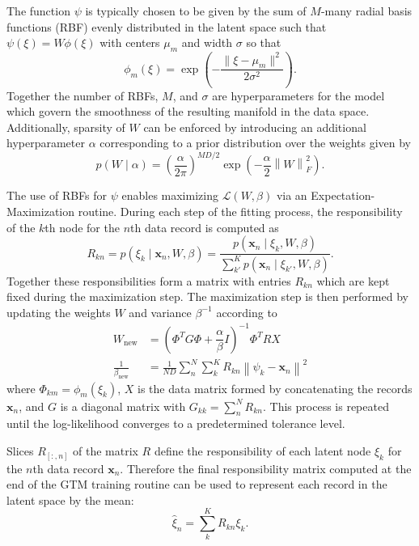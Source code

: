 \documentclass[remotesensing,article,submit,pdftex,moreauthors]{Definitions/mdpi}
\begin{document}
The function $\psi$ is typically chosen to be given by the sum of $M$-many radial basis functions (RBF) evenly distributed in the latent space such that $\psi(\xi) = W\phi(\xi)$ with centers $\mu_m$ and width $\sigma$ so that
\begin{equation}
    \phi_m(\xi) = \exp\left(-\dfrac{\lVert \xi - \mu_m \rVert^2}{2\sigma^2}\right).
\end{equation}
Together the number of RBFs, $M$, and $\sigma$ are hyperparameters for the model which govern the smoothness of the resulting manifold in the data space. Additionally, sparsity of $W$ can be enforced by introducing an additional hyperparameter $\alpha$ corresponding to a prior distribution over the weights given by
\begin{equation}\label{eq:weight-prior}
    p(W \mid \alpha) =  \left( \frac{\alpha}{2\pi} \right)^{MD/2}\exp\left(-\frac{\alpha}{2}\left\lVert W \right\rVert_{F}^2\right).
\end{equation}

The use of RBFs for $\psi$ enables maximizing $\mathcal{L}(W,\beta)$ via an Expectation-Maximization routine. During each step of the fitting process, the responsibility of the $k$th node for the $n$th data record is computed as 
\begin{equation}\label{eq:responsibility}
    R_{kn} = p(\xi_k \mid \mathbf{x}_n, W, \beta) = \dfrac{p(\mathbf{x}_n \mid \xi_k, W, \beta)}{\sum\limits_{k'}^{K} p(\mathbf{x}_n \mid \xi_{k'}, W, \beta)}.
\end{equation}
Together these responsibilities form a matrix with entries $R_{kn}$ which are kept fixed during the maximization step. The maximization step is then performed by updating the weights $W$ and variance $\beta^{-1}$ according to
\begin{align}\label{eq:m-step}
    W_{\text{new}} &= \left(\Phi^T G \Phi + \dfrac{\alpha}{\beta}I \right)^{-1} \Phi^T R X  \\
    \frac{1}{\beta_{\text{new}}} &= \frac{1}{ND} \sum\limits_{n}^{N} \sum\limits_{k}^{K} R_{kn} \left\lVert \psi_k - \mathbf{x}_n \right\rVert^2
\end{align}
where $\Phi_{km} = \phi_m(\xi_k)$, $X$ is the data matrix formed by concatenating the records $\mathbf{x}_n$, and $G$ is a diagonal matrix with $G_{kk} = \sum\limits_n^N R_{kn}$. This process is repeated until the log-likelihood converges to a predetermined tolerance level.

Slices $R_{[:,n]}$ of the matrix $R$ define the responsibility of each latent node $\xi_k$ for the $n$th data record $\mathbf{x}_n$. Therefore the final responsibility matrix computed at the end of the GTM training routine can be used to represent each record in the latent space by the mean:
\begin{equation}
    \hat{\xi}_n = \sum_{k}^K R_{kn}\xi_k.
\end{equation}
\end{document}
